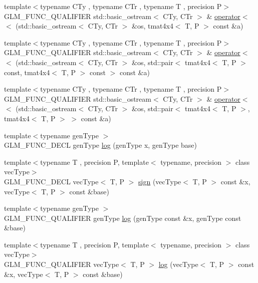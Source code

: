 \begin{DoxyCompactItemize}
\item 
{\footnotesize template$<$typename C\+Ty , typename C\+Tr , typename T , precision P$>$ }\\G\+L\+M\+\_\+\+F\+U\+N\+C\+\_\+\+Q\+U\+A\+L\+I\+F\+I\+E\+R std\+::basic\+\_\+ostream$<$ C\+Ty, C\+Tr $>$ \& \hyperlink{group__gtx__io_ga6683acc91ba7ce5822e25a2517550bff}{operator$<$$<$} (std\+::basic\+\_\+ostream$<$ C\+Ty, C\+Tr $>$ \&os, tmat4x4$<$ T, P $>$ const \&a)
\item 
{\footnotesize template$<$typename C\+Ty , typename C\+Tr , typename T , precision P$>$ }\\G\+L\+M\+\_\+\+F\+U\+N\+C\+\_\+\+Q\+U\+A\+L\+I\+F\+I\+E\+R std\+::basic\+\_\+ostream$<$ C\+Ty, C\+Tr $>$ \& \hyperlink{group__gtx__io_ga112ff562e10c18929151d17e711e27a7}{operator$<$$<$} (std\+::basic\+\_\+ostream$<$ C\+Ty, C\+Tr $>$ \&os, std\+::pair$<$ tmat4x4$<$ T, P $>$ const, tmat4x4$<$ T, P $>$ const  $>$ const \&a)
\item 
{\footnotesize template$<$typename C\+Ty , typename C\+Tr , typename T , precision P$>$ }\\G\+L\+M\+\_\+\+F\+U\+N\+C\+\_\+\+Q\+U\+A\+L\+I\+F\+I\+E\+R std\+::basic\+\_\+ostream$<$ C\+Ty, C\+Tr $>$ \& \hyperlink{group__gtx__io_gad09c7114641975d778243bd4379a3ea5}{operator$<$$<$} (std\+::basic\+\_\+ostream$<$ C\+Ty, C\+Tr $>$ \&os, std\+::pair$<$ tmat4x4$<$ T, P $>$, tmat4x4$<$ T, P $>$ $>$ const \&a)
\item 
{\footnotesize template$<$typename gen\+Type $>$ }\\G\+L\+M\+\_\+\+F\+U\+N\+C\+\_\+\+D\+E\+C\+L gen\+Type \hyperlink{group__gtx__log__base_ga3e5bcabee78a977e3d7d1bf352b9ea9f}{log} (gen\+Type x, gen\+Type base)
\item 
{\footnotesize template$<$typename T , precision P, template$<$ typename, precision $>$ class vec\+Type$>$ }\\G\+L\+M\+\_\+\+F\+U\+N\+C\+\_\+\+D\+E\+C\+L vec\+Type$<$ T, P $>$ \hyperlink{group__gtx__log__base_ga1842004a127a9f3573764362ff639191}{sign} (vec\+Type$<$ T, P $>$ const \&x, vec\+Type$<$ T, P $>$ const \&base)
\item 
{\footnotesize template$<$typename gen\+Type $>$ }\\G\+L\+M\+\_\+\+F\+U\+N\+C\+\_\+\+Q\+U\+A\+L\+I\+F\+I\+E\+R gen\+Type \hyperlink{namespaceglm_a5005a3ed3bb27842d792fe01691de478}{log} (gen\+Type const \&x, gen\+Type const \&base)
\item 
{\footnotesize template$<$typename T , precision P, template$<$ typename, precision $>$ class vec\+Type$>$ }\\G\+L\+M\+\_\+\+F\+U\+N\+C\+\_\+\+Q\+U\+A\+L\+I\+F\+I\+E\+R vec\+Type$<$ T, P $>$ \hyperlink{namespaceglm_a34910ffc6f0455ba14d6a0c4c75b0607}{log} (vec\+Type$<$ T, P $>$ const \&x, vec\+Type$<$ T, P $>$ const \&base)

\end{DoxyCompactItemize}
